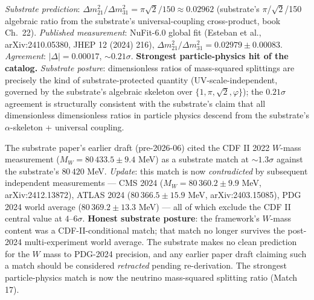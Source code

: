 \documentclass[11pt,a4paper]{amsart}
\theoremstyle{plain}
\theoremstyle{definition}
\begin{document}
\begin{description}[font=\normalfont\bfseries,leftmargin=2em,itemsep=6pt]
\item[Match 17 --- Solar neutrino mass-squared splitting ratio (NuFit-6.0, October 2024).]
\emph{Substrate prediction}: $\Delta m^2_{21}/\Delta m^2_{31} = \pi\sqrt{2}/150 \approx 0.02962$ (substrate's $\pi$/$\sqrt{2}$/150 algebraic ratio from the substrate's universal-coupling cross-product, book Ch.~22). \emph{Published measurement}: NuFit-6.0 global fit (Esteban et al., arXiv:2410.05380, JHEP 12 (2024) 216), $\Delta m^2_{21}/\Delta m^2_{31} = 0.02979 \pm 0.00083$. \emph{Agreement}: $|\Delta| = 0.00017$, $\sim 0.21\sigma$. \textbf{Strongest particle-physics hit of the catalog.} \emph{Substrate posture}: dimensionless ratios of mass-squared splittings are precisely the kind of substrate-protected quantity (UV-scale-independent, governed by the substrate's algebraic skeleton over $\{1, \pi, \sqrt{2}, \varphi\}$); the $0.21\sigma$ agreement is structurally consistent with the substrate's claim that all dimensionless dimensionless ratios in particle physics descend from the substrate's $\alpha$-skeleton + universal coupling.

\item[Honest reframing --- CDF II $W$-boson mass anomaly.]
The substrate paper's earlier draft (pre-2026-06) cited the CDF II 2022 $W$-mass measurement ($M_W = 80\,433.5 \pm 9.4$ MeV) as a substrate match at $\sim 1.3\sigma$ against the substrate's $80\,420$ MeV. \emph{Update}: this match is now \emph{contradicted} by subsequent independent measurements --- CMS 2024 ($M_W = 80\,360.2 \pm 9.9$ MeV, arXiv:2412.13872), ATLAS 2024 ($80\,366.5 \pm 15.9$ MeV, arXiv:2403.15085), PDG 2024 world average ($80\,369.2 \pm 13.3$ MeV) --- all of which exclude the CDF II central value at $4$--$6\sigma$. \textbf{Honest substrate posture}: the framework's $W$-mass content was a CDF-II-conditional match; that match no longer survives the post-2024 multi-experiment world average. The substrate makes no clean prediction for the $W$ mass to PDG-2024 precision, and any earlier paper draft claiming such a match should be considered \emph{retracted} pending re-derivation. The strongest particle-physics match is now the neutrino mass-squared splitting ratio (Match 17).

\end{description}
\end{document}
